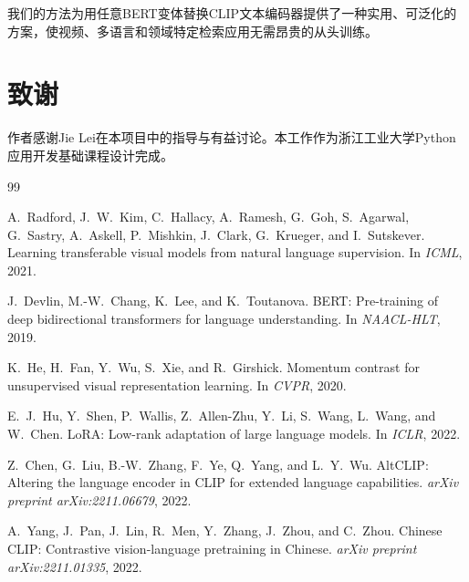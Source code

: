 \documentclass[10pt,a4paper]{ctexart}
\begin{document}
我们的方法为用任意BERT变体替换CLIP文本编码器提供了一种实用、可泛化的方案，使视频、多语言和领域特定检索应用无需昂贵的从头训练。

\section*{致谢}

作者感谢Jie Lei在本项目中的指导与有益讨论。本工作作为浙江工业大学Python应用开发基础课程设计完成。

\bigskip


\begin{thebibliography}{99}

A.~Radford, J.~W.~Kim, C.~Hallacy, A.~Ramesh, G.~Goh, S.~Agarwal, G.~Sastry, A.~Askell, P.~Mishkin, J.~Clark, G.~Krueger, and I.~Sutskever.
\newblock Learning transferable visual models from natural language supervision.
\newblock In \textit{ICML}, 2021.

J.~Devlin, M.-W.~Chang, K.~Lee, and K.~Toutanova.
\newblock BERT: Pre-training of deep bidirectional transformers for language understanding.
\newblock In \textit{NAACL-HLT}, 2019.

K.~He, H.~Fan, Y.~Wu, S.~Xie, and R.~Girshick.
\newblock Momentum contrast for unsupervised visual representation learning.
\newblock In \textit{CVPR}, 2020.

E.~J.~Hu, Y.~Shen, P.~Wallis, Z.~Allen-Zhu, Y.~Li, S.~Wang, L.~Wang, and W.~Chen.
\newblock LoRA: Low-rank adaptation of large language models.
\newblock In \textit{ICLR}, 2022.

Z.~Chen, G.~Liu, B.-W.~Zhang, F.~Ye, Q.~Yang, and L.~Y.~Wu.
\newblock AltCLIP: Altering the language encoder in CLIP for extended language capabilities.
\newblock \textit{arXiv preprint arXiv:2211.06679}, 2022.

A.~Yang, J.~Pan, J.~Lin, R.~Men, Y.~Zhang, J.~Zhou, and C.~Zhou.
\newblock Chinese CLIP: Contrastive vision-language pretraining in Chinese.
\newblock \textit{arXiv preprint arXiv:2211.01335}, 2022.


\end{thebibliography}
\end{document}
